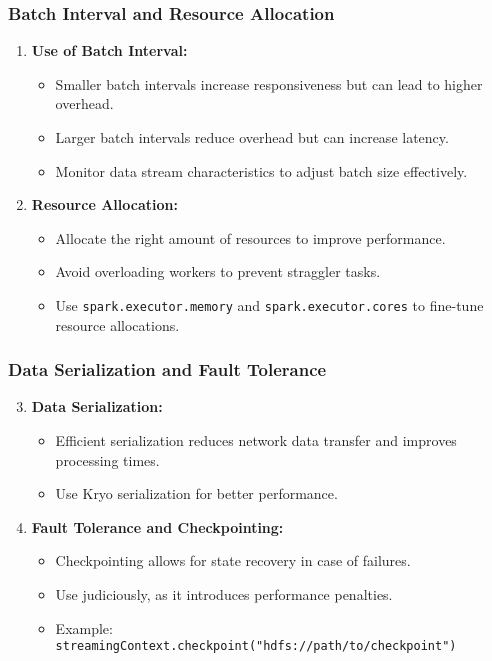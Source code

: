 \documentclass[aspectratio=169]{beamer}
\begin{document}
\begin{frame}
    \frametitle{Batch Interval and Resource Allocation}
    \begin{enumerate}
        \item \textbf{Use of Batch Interval:}
        \begin{itemize}
            \item Smaller batch intervals increase responsiveness but can lead to higher overhead.
            \item Larger batch intervals reduce overhead but can increase latency.
            \item Monitor data stream characteristics to adjust batch size effectively.
        \end{itemize}
        
        \item \textbf{Resource Allocation:}
        \begin{itemize}
            \item Allocate the right amount of resources to improve performance.
            \item Avoid overloading workers to prevent straggler tasks.
            \item Use \texttt{spark.executor.memory} and \texttt{spark.executor.cores} to fine-tune resource allocations.
        \end{itemize}
    \end{enumerate}
\end{frame}

\begin{frame}
    \frametitle{Data Serialization and Fault Tolerance}
    \begin{enumerate}
        \setcounter{enumi}{2}
        \item \textbf{Data Serialization:}
        \begin{itemize}
            \item Efficient serialization reduces network data transfer and improves processing times.
            \item Use Kryo serialization for better performance.
        \end{itemize}
        
        \item \textbf{Fault Tolerance and Checkpointing:}
        \begin{itemize}
            \item Checkpointing allows for state recovery in case of failures.
            \item Use judiciously, as it introduces performance penalties.
            \item Example: \texttt{streamingContext.checkpoint("hdfs://path/to/checkpoint")}
        \end{itemize}
    \end{enumerate}
\end{frame}
\end{document}
